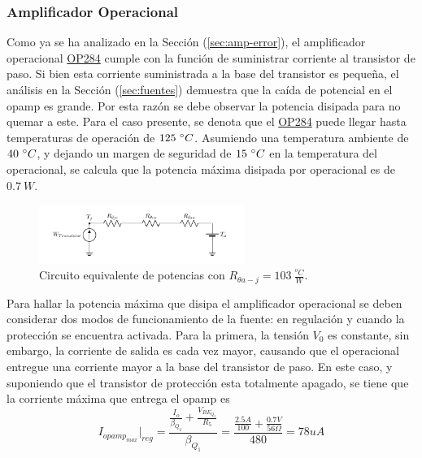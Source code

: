 \subsubsection{Amplificador Operacional}
\label{sec:opamppot}

Como ya se ha analizado en la Sección (\ref{sec:amp-error}), el amplificador operacional \href{https://www.alldatasheet.com/datasheet-pdf/pdf/49039/AD/OP284.html}{OP284} cumple con la función de suministrar corriente al transistor de paso. Si bien esta corriente suministrada a la base del transistor es pequeña, el análisis en la Sección (\ref{sec:fuentes}) demuestra que la caída de potencial en el opamp es grande. Por esta razón se debe observar la potencia disipada para no quemar a este. Para el caso presente, se denota que el \href{https://www.alldatasheet.com/datasheet-pdf/pdf/49039/AD/OP284.html}{OP284} puede llegar hasta temperaturas de operación de $125 \ \degree C$. Asumiendo una temperatura ambiente de $40 \ \degree C$, y dejando un margen de seguridad de $15 \ \degree C$ en la temperatura del operacional, se calcula que la potencia máxima disipada por operacional es de $0.7 \ W$.
\begin{figure}[H]
\centering
	\includegraphics[width=0.6\textwidth, page=2]{ImagenesEjercicio2/Potencia.pdf}
	\caption{Circuito equivalente de potencias con $R_{\theta a-j} = 103 \ \frac{^o C}{W}$.}
	\label{fig:circuitopot}
\end{figure}

Para hallar la potencia máxima que disipa el amplificador operacional se deben considerar dos modos de funcionamiento de la fuente: en regulación y cuando la protección se encuentra activada. Para la primera, la tensión $V_0$ es constante, sin embargo, la corriente de salida es cada vez mayor, causando que el operacional entregue una corriente mayor a la base del transistor de paso. En este caso, y suponiendo que el transistor de protección esta totalmente apagado, se tiene que la corriente máxima que entrega el opamp es
\begin{equation}
	I_{opamp_{max}}|_{reg} = \frac{\frac{I_{o}}{\beta_{Q_2}}+\frac{V_{BE_{Q_2}}}{R_5}}{\beta_{Q_1}} =  \frac{\frac{2.5A}{100}+\frac{0.7V}{56\Omega}}{480} = 78uA
\end{equation}

